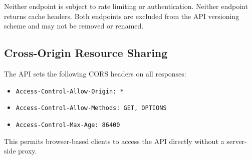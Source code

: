 Neither endpoint is subject to rate limiting or authentication.  Neither
endpoint returns cache headers.  Both endpoints are excluded from the
API versioning scheme and may not be removed or renamed.

\subsection{Cross-Origin Resource Sharing}\label{sec:api:cors}

The API sets the following CORS headers on all responses:

\begin{itemize}
  \item \texttt{Access-Control-Allow-Origin:~*}
  \item \texttt{Access-Control-Allow-Methods:~GET,~OPTIONS}
  \item \texttt{Access-Control-Max-Age:~86400}
\end{itemize}

This permits browser-based clients to access the API directly without a
server-side proxy.
